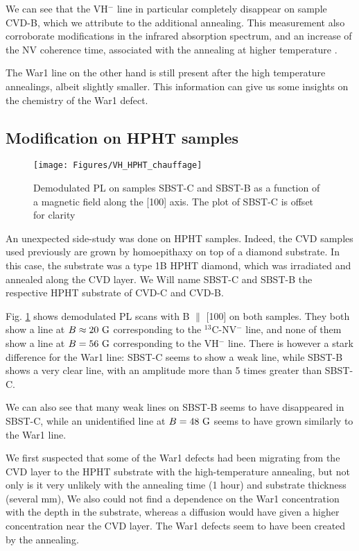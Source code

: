 \documentclass[a4paper,11pt]{report}
\begin{document}
We can see that the VH$^-$ line in particular completely disappear on sample CVD-B, which we attribute to the additional annealing. This measurement also corroborate modifications in the infrared absorption spectrum, and an increase of the NV coherence time, associated with the annealing at higher temperature \citep{ngambou2022improving}.

The War1 line on the other hand is still present after the high temperature annealings, albeit slightly smaller. This information can give us some insights on the chemistry of the War1 defect. %

\subsection{Modification on HPHT samples}

\begin{figure}[h]
\centering
\texttt{[image: Figures/VH\_HPHT\_chauffage]}
\caption{Demodulated PL on samples SBST-C and SBST-B as a function of a magnetic field along the [100] axis. The plot of SBST-C is offset for clarity}
\label{chauffage HPHT}
\end{figure}

An unexpected side-study was done on HPHT samples. Indeed, the CVD samples used previously are grown by homoepithaxy on top of a diamond substrate. In this case, the substrate was a type 1B HPHT diamond, which was irradiated and annealed along the CVD layer. We Will name SBST-C and SBST-B the respective HPHT substrate of CVD-C and CVD-B.

Fig. \ref{chauffage HPHT} shows demodulated PL scans with B $\parallel$ [100] on both samples. They both show a line at $B \approx 20\ \rm G$ corresponding to the $^{13}$C-NV$^-$ line, and none of them show a line at $B = 56\ \rm G$ corresponding to the VH$^-$ line. There is however a stark difference for the War1 line: SBST-C seems to show a weak line, while SBST-B shows a very clear line, with an amplitude more than 5 times greater than SBST-C. 

We can also see that many weak lines on SBST-B seems to have disappeared in SBST-C, while an unidentified line at $B = 48\ \rm G$ seems to have grown similarly to the War1 line.

We first suspected that some of the War1 defects had been migrating from the CVD layer to the HPHT substrate with the high-temperature annealing, but not only is it very unlikely with the annealing time (1 hour) and substrate thickness (several mm), We also could not find a dependence on the War1 concentration with the depth in the substrate, whereas a diffusion would have given a higher concentration near the CVD layer. The War1 defects seem to have been created by the annealing.
\end{document}
